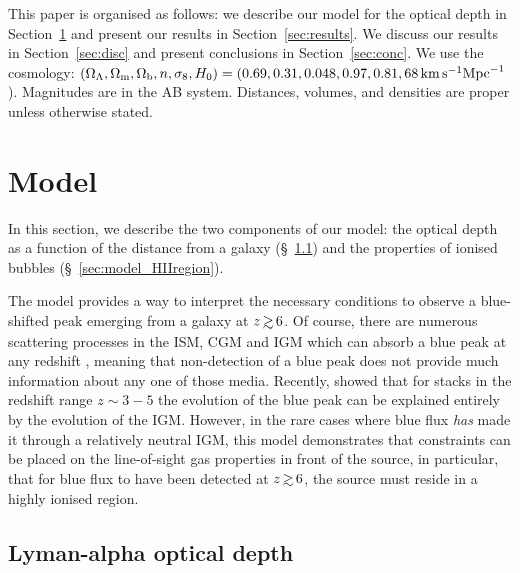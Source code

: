 \documentclass[fleqn,usenatbib]{mnras}
\begin{document}
This paper is organised as follows: we describe our model for the \lya optical depth in Section~\ref{sec:model} and present our results in Section~\ref{sec:results}. We discuss our results in Section~\ref{sec:disc} and present conclusions in Section~\ref{sec:conc}. We use the \citet{PlanckCollaboration2015} cosmology: $(\OL, \Om, \Ob, n,  \sigma_8, H_0) = (0.69, 0.31, 0.048, 0.97, 0.81, 68 \kms \mathrm{Mpc}^{-1}$). Magnitudes are in the AB system. Distances, volumes, and densities are proper unless otherwise stated.

\section{Model}
\label{sec:model}
In this section, we describe the two components of our model: the \lya optical depth as a function of the distance from a galaxy (\S~\ref{sec:model_optdepth}) and the properties of ionised bubbles (\S~\ref{sec:model_HIIregion}).

The model provides a way to interpret the necessary conditions to observe a blue-shifted \lya peak emerging from a galaxy at $z\simgt6$. Of course, there are numerous scattering processes in the ISM, CGM and IGM which can absorb a blue peak at any redshift \citep[e.g.,][]{Gunn1965,Zheng2010,Laursen2011}, meaning that non-detection of a blue peak does not provide much information about any one of those media. Recently, \citet{Hayes2020} showed
that for stacks in the redshift range $z\sim 3-5$ the evolution of the blue peak can be explained entirely by the evolution of the IGM.
However, in the rare cases where blue \lya flux \textit{has} made it through a relatively neutral IGM, this model demonstrates that constraints can be placed on the line-of-sight gas properties in front of the source, in particular, that for blue flux to have been detected at $z\simgt6$, the source must reside in a highly ionised region.

\subsection{Lyman-alpha optical depth}
\label{sec:model_optdepth}
\end{document}
